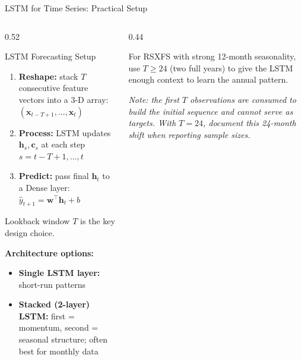 \documentclass[aspectratio=169, 10pt]{beamer}
\begin{document}
\begin{frame}{LSTM for Time Series: Practical Setup}
  \begin{columns}[T]
    \begin{column}{0.52\textwidth}
      \begin{definitionbox}{LSTM Forecasting Setup}
        \footnotesize
        \begin{enumerate}
          \item \textbf{Reshape:} stack $T$ consecutive feature vectors into
                a 3-D array: $(\mathbf{x}_{t-T+1}, \ldots, \mathbf{x}_t)$
          \item \textbf{Process:} LSTM updates $\mathbf{h}_s, \mathbf{c}_s$
                at each step $s = t-T+1, \ldots, t$
          \item \textbf{Predict:} pass final $\mathbf{h}_t$ to a Dense
                layer: $\hat{y}_{t+1} = \mathbf{w}^\top \mathbf{h}_t + b$
        \end{enumerate}
        Lookback window $T$ is the key design choice.
      \end{definitionbox}

      \smallskip
      \textbf{Architecture options:}
      \begin{itemize}\footnotesize
        \item \textbf{Single LSTM layer:} short-run patterns
        \item \textbf{Stacked (2-layer) LSTM:} first = momentum,
              second = seasonal structure; often best for monthly data
      \end{itemize}
    \end{column}
    \begin{column}{0.44\textwidth}
      \begin{keybox}
        \footnotesize
        For RSXFS with strong 12-month seasonality, use
        $T \geq 24$ (two full years) to give the LSTM enough
        context to learn the annual pattern.
      \end{keybox}

      \smallskip
      \textit{\footnotesize Note: the first $T$ observations are consumed
      to build the initial sequence and cannot serve as targets. With
      $T = 24$, document this 24-month shift when reporting sample sizes.}
    \end{column}
  \end{columns}
\end{frame}
\end{document}
